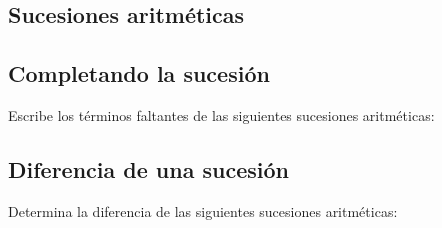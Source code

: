 \documentclass[12pt,addpoints]{evalua}
\begin{document}
\begin{questions}
      
	\section*{Sucesiones aritméticas}
      
	\subsection*{Completando la sucesión}
    
      \question[4] Escribe los términos faltantes de las siguientes sucesiones aritméticas:
    
      \begin{multicols}{2}
      \end{multicols}


      
	\subsection*{Diferencia de una sucesión}

      \question[4] Determina la diferencia de las siguientes sucesiones aritméticas:
      

\end{questions}
\end{document}
